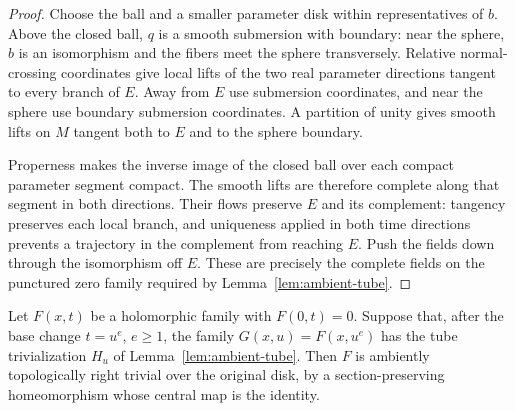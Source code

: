 \begin{proof}
Choose the ball and a smaller parameter disk within representatives of
$b$. Above the closed ball, $q$ is a smooth submersion with boundary:
near the sphere, $b$ is an isomorphism and the fibers meet the sphere
transversely. Relative normal-crossing coordinates give local lifts of
the two real parameter directions tangent to every branch of $E$.
Away from $E$ use submersion coordinates, and near the sphere use boundary
submersion coordinates. A partition of unity gives smooth lifts on $M$
tangent both to $E$ and to the sphere boundary.

Properness makes the inverse image of the closed ball over each compact
parameter segment compact. The smooth lifts are therefore complete along
that segment in both directions. Their flows preserve $E$ and its
complement: tangency preserves each local branch, and uniqueness applied
in both time directions prevents a trajectory in the complement from
reaching $E$. Push the fields down through the isomorphism off $E$.
These are precisely the complete fields on the punctured zero family
required by Lemma~\ref{lem:ambient-tube}.
\end{proof}

\begin{lemma}
\label{lem:remove-base-change}
Let $F(x,t)$ be a holomorphic family with $F(0,t)=0$.
Suppose that, after the base change $t=u^e$, $e\ge1$, the family
$G(x,u)=F(x,u^e)$ has the tube trivialization $H_u$ of
Lemma~\ref{lem:ambient-tube}. Then $F$ is ambiently topologically right
trivial over the original disk, by a section-preserving homeomorphism
whose central map is the identity.
\end{lemma}

